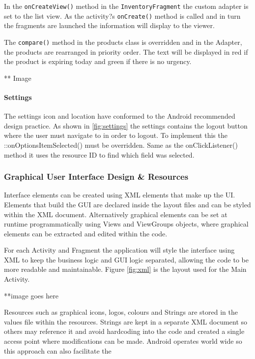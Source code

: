 \documentclass[a4paper, 11pt]{article}
\begin{document}
 In the \texttt {onCreateView()} method in the \texttt{InventoryFragment} the custom adapter is set to the list view. As the activity?s \texttt{onCreate()} method is called and in turn the fragments are launched the information will display to the viewer. 

The \texttt{compare()} method in the products class is overridden and in the Adapter, the products are rearranged in priority order. The text will be displayed in red if the product is expiring today and green if there is no urgency. 

** Image 

\paragraph{Settings} 
The settings icon and location have conformed to the Android recommended design practice. As shown in \ref{fig:settings} the settings contains the logout button where the user must navigate to in order to logout. To implement this the ::onOptionsItemSelected() must be overridden. Same as the onClickListener() method it uses the resource ID to find which field was selected. 
 
\subsubsection{Graphical User Interface Design \& Resources}
Interface elements can be created using XML elements that make up the UI. Elements that build the GUI are declared inside the layout files and can be styled within the XML document. Alternatively graphical elements can be set at runtime programmatically using Views and ViewGroups objects, where graphical elements can be extracted and edited within the code. 

For each Activity and Fragment the application will style the interface using XML to keep the business logic and GUI logic separated, allowing the code to be more readable and maintainable. Figure \ref{fig:xml} is the layout used for the Main Activity. 

**image goes here

Resources such as graphical icons, logos, colours and Strings are stored in the values file within the resources. Strings are kept in a separate XML document so others may reference it and avoid hardcoding into the code and created a single access point where modifications can be made. Android operates world wide so this approach can also facilitate the 
\end{document}
